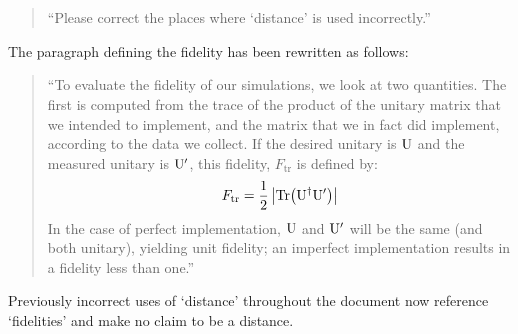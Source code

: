 \documentclass[a4paper,11pt]{article}
\begin{document}
\section{}
\begin{quote}
  ``Please correct the places where `distance' is used incorrectly.''
\end{quote}
The paragraph defining the fidelity has been rewritten as follows:
\begin{quote}
  ``To evaluate the fidelity of our simulations, we look at two quantities. The
  first is computed from the trace of the product of the unitary matrix that we
  intended to implement, and the matrix that we in fact did implement, according
  to the data we collect. If the desired unitary is \(\mathrm{U}\) and
  the measured unitary is \(\mathrm{U^{\prime}}\), this fidelity,
  \(F_{\mathrm{tr}}\) is defined by:
  \begin{equation}
    F_{\mathrm{tr}}=\frac{1}{2}\left|\mathrm{Tr}\!\left(\mathrm{U}^{\dagger}{\mathrm{U}^{\prime}}\right)\right|
  \end{equation}
  In the case of perfect implementation, \(\mathrm{U}\) and \(\mathrm{U^{\prime}}\)
  will be the same (and both unitary), yielding unit fidelity; an imperfect
  implementation results in a fidelity less than one.''
\end{quote}
Previously incorrect uses of `distance' throughout the document now reference
`fidelities' and make no claim to be a distance.
\end{document}
